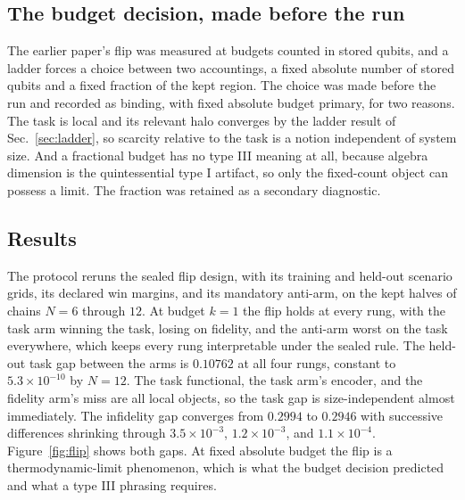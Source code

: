 \documentclass[aps,prd,reprint,nofootinbib,longbibliography]{revtex4-2}
\begin{document}
\subsection{The budget decision, made before the run}

The earlier paper's flip was measured at budgets counted in stored
qubits, and a ladder forces a choice between two accountings, a fixed
absolute number of stored qubits and a fixed fraction of the kept region.
The choice was made before the run and recorded as binding, with fixed
absolute budget primary, for two reasons.  The task is local and its
relevant halo converges by the ladder result of Sec.~\ref{sec:ladder}, so
scarcity relative to the task is a notion independent of system size.
And a fractional budget has no type III meaning at all, because algebra
dimension is the quintessential type I artifact, so only the fixed-count
object can possess a limit.  The fraction was retained as a secondary
diagnostic.

\subsection{Results}

The protocol reruns the sealed flip design, with its training and
held-out scenario grids, its declared win margins, and its mandatory
anti-arm, on the kept halves of chains $N=6$ through $12$.  At budget
$k=1$ the flip holds at every rung, with the task arm winning the task,
losing on fidelity, and the anti-arm worst on the task everywhere, which
keeps every rung interpretable under the sealed rule.  The held-out task
gap between the arms is $0.10762$ at all four rungs, constant to
$5.3\times 10^{-10}$ by $N=12$.  The task functional, the task arm's
encoder, and the fidelity arm's miss are all local objects, so the task
gap is size-independent almost immediately.  The infidelity gap converges
from $0.2994$ to $0.2946$ with successive differences shrinking through
$3.5\times 10^{-3}$, $1.2\times 10^{-3}$, and $1.1\times 10^{-4}$.
Figure~\ref{fig:flip} shows both gaps.  At fixed absolute budget the flip
is a thermodynamic-limit phenomenon, which is what the budget decision
predicted and what a type III phrasing requires.
\end{document}
